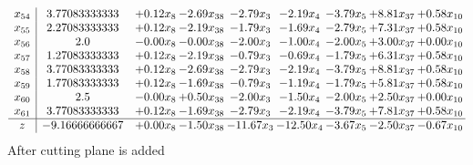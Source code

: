 \documentclass[8pt]{article}
\begin{document}
\[\begin{array}{c| c c@{\hskip 2pt} c@{\hskip 2pt} c@{\hskip 2pt} c@{\hskip 2pt} c@{\hskip 2pt} c@{\hskip 2pt} c@{\hskip 2pt} }
 x_{54}   &  3.77083333333 & +  0.12 x_{8} & -2.69 x_{38} & -2.79 x_{3} & -2.19 x_{4} & -3.79 x_{5} & +  8.81 x_{37} & +  0.58 x_{10}\\
 x_{55}   &  2.27083333333 & +  0.12 x_{8} & -2.19 x_{38} & -1.79 x_{3} & -1.69 x_{4} & -2.79 x_{5} & +  7.31 x_{37} & +  0.58 x_{10}\\
 x_{56}   &  2.0 & -0.00 x_{8} & -0.00 x_{38} & -2.00 x_{3} & -1.00 x_{4} & -2.00 x_{5} & +  3.00 x_{37} & +  0.00 x_{10}\\
 x_{57}   &  1.27083333333 & +  0.12 x_{8} & -2.19 x_{38} & -0.79 x_{3} & -0.69 x_{4} & -1.79 x_{5} & +  6.31 x_{37} & +  0.58 x_{10}\\
 x_{58}   &  3.77083333333 & +  0.12 x_{8} & -2.69 x_{38} & -2.79 x_{3} & -2.19 x_{4} & -3.79 x_{5} & +  8.81 x_{37} & +  0.58 x_{10}\\
 x_{59}   &  1.77083333333 & +  0.12 x_{8} & -1.69 x_{38} & -0.79 x_{3} & -1.19 x_{4} & -1.79 x_{5} & +  5.81 x_{37} & +  0.58 x_{10}\\
 x_{60}   &  2.5 & -0.00 x_{8} & +  0.50 x_{38} & -2.00 x_{3} & -1.50 x_{4} & -2.00 x_{5} & +  2.50 x_{37} & +  0.00 x_{10}\\
 x_{61}   &  3.77083333333 & +  0.12 x_{8} & -1.69 x_{38} & -2.79 x_{3} & -2.19 x_{4} & -3.79 x_{5} & +  7.81 x_{37} & +  0.58 x_{10}\\
\hline
z    &  -9.16666666667 & +  0.00 x_{8} & -1.50 x_{38} & -11.67 x_{3} & -12.50 x_{4} & -3.67 x_{5} & -2.50 x_{37} & -0.67 x_{10}\\
\end{array}\]
 After cutting plane is added 
\end{document}
